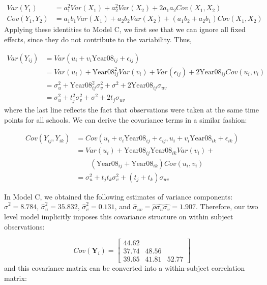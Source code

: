 \documentclass[
]{krantz}
\begin{document}
\begin{align*}
Var(Y_1) & = a^{2}_{1} Var(X_1) + a^{2}_{2} Var(X_2) + 2 a_1 a_2 Cov(X_1,X_2) \\
Cov(Y_1,Y_2) & = a_1 b_1 Var(X_1) + a_2 b_2 Var(X_2) + (a_1 b_2 + a_2 b_1) Cov(X_1,X_2)
\end{align*}
\noindent Applying these identities to Model C, we first see that we can ignore all fixed effects, since they do not contribute to the variability. Thus,

\begin{align*}
Var(Y_{ij}) & = Var(u_{i}+v_{i}\textrm{Year08}_{ij}+\epsilon_{ij}) \\
 & = Var(u_{i}) + \textrm{Year08}^{2}_{ij} Var(v_{i}) + Var(\epsilon_{ij}) + 2\textrm{Year08}_{ij} Cov(u_{i},v_{i}) \\
 & = \sigma_{u}^{2} + \textrm{Year08}^{2}_{ij} \sigma_{v}^{2} + \sigma^{2} + 2\textrm{Year08}_{ij}\sigma_{uv} \\
 & = \sigma_{u}^{2} + t^{2}_{j} \sigma_{v}^{2} + \sigma^{2} + 2t_{j}\sigma_{uv}
\end{align*}
\noindent where the last line reflects the fact that observations were taken at the same time points for all schools. We can derive the covariance terms in a similar fashion:

\begin{align*}
Cov(Y_{ij},Y_{ik}) & = Cov(u_{i}+ v_{i}\textrm{Year08}_{ij}+\epsilon_{ij}, u_{i}+v_{i}\textrm{Year08}_{ik}+\epsilon_{ik}) \\
 & = Var(u_{i}) + \textrm{Year08}_{ij}\textrm{Year08}_{ik} Var(v_{i}) + \\
 & \qquad (\textrm{Year08}_{ij} + \textrm{Year08}_{ik}) Cov(u_{i},v_{i}) \\
 & = \sigma_{u}^{2} + t_{j}t_{k} \sigma_{v}^{2} + (t_{j}+t_{k})\sigma_{uv}
\end{align*}

In Model C, we obtained the following estimates of variance components: \(\hat{\sigma}^{2}=8.784\), \(\hat{\sigma}^{2}_{u}=35.832\), \(\hat{\sigma}^{2}_{v}=0.131\), and \(\hat{\sigma}_{uv}=\hat{\rho}\hat{\sigma_{u}}\hat{\sigma_{v}}=1.907\). Therefore, our two level model implicitly imposes this covariance structure on within subject observations:

\[ Cov(\mathbf{Y}_i) =  \left[
          \begin{array}{cccc}
            44.62 & &   \\
            37.74 & 48.56 &  \\
            39.65 & 41.81 & 52.77
          \end{array} \right] \]
and this covariance matrix can be converted into a within-subject correlation matrix:
\end{document}
